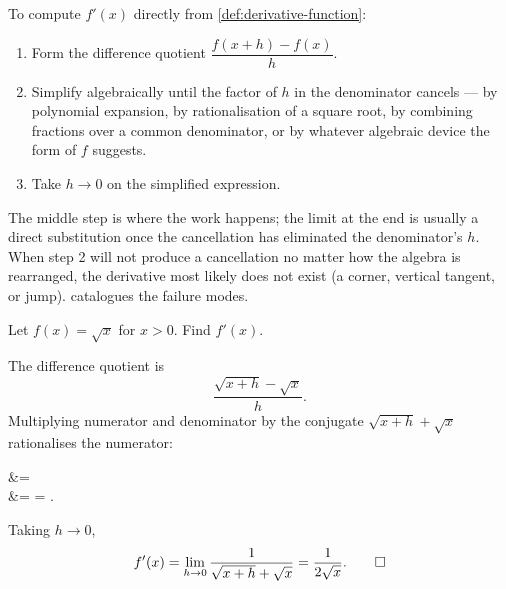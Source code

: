 \begin{strategy}
To compute \(f'(x)\) directly from \cref{def:derivative-function}:
\begin{enumerate}
    \item Form the difference quotient \(\dfrac{f(x + h) - f(x)}{h}\).
    \item Simplify algebraically until the factor of \(h\) in the denominator cancels --- by polynomial expansion, by rationalisation of a square root, by combining fractions over a common denominator, or by whatever algebraic device the form of \(f\) suggests.
    \item Take \(h \to 0\) on the simplified expression.
\end{enumerate}
The middle step is where the work happens; the limit at the end is usually a direct substitution once the cancellation has eliminated the denominator's \(h\). When step 2 will not produce a cancellation no matter how the algebra is rearranged, the derivative most likely does not exist (a corner, vertical tangent, or jump).  catalogues the failure modes.
\end{strategy}

\begin{workedexample}
\begin{example}\label{ex:derivative-sqrt-x}
Let \(f(x) = \sqrt{x}\) for \(x > 0\). Find \(f'(x)\).
\end{example}

\begin{solution}
The difference quotient is
\[
\frac{\sqrt{x + h} - \sqrt{x}}{h}.
\]
Multiplying numerator and denominator by the conjugate \(\sqrt{x + h} + \sqrt{x}\) rationalises the numerator:
\begin{aligneddisplay}
&=  \\
&= 
 = .
\end{aligneddisplay}
Taking \(h \to 0\),
\[
f'(x) = \lim_{h \to 0} \frac{1}{\sqrt{x + h} + \sqrt{x}}
      = \frac{1}{2\sqrt{x}}. \qedhere
\]
\end{solution}
\end{workedexample}

